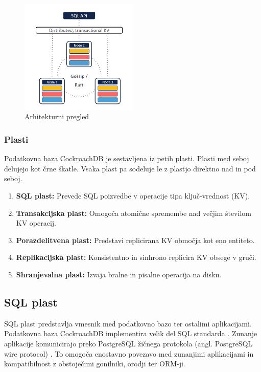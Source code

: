 \documentclass[a4paper, 12pt]{book}
\begin{document}
\begin{figure}[H]
\begin{center}
\includegraphics[width=0.5\textwidth]{resources/crdb-arhitecture-overview.png}
\end{center}
\caption{Arhitekturni pregled \cite{CRDB-2017}}
\label{img_crdb_arhitecture_overview}
\end{figure}

\subsubsection{Plasti}
Podatkovna baza CockroachDB je sestavljena iz petih plasti. Plasti med seboj delujejo kot črne škatle. Vsaka plast pa sodeluje le z plastjo direktno nad in pod seboj.

\begin{enumerate}
    \item \textbf{SQL plast:} Prevede SQL poizvedbe v operacije tipa ključ-vrednost (KV).
    \item \textbf{Transakcijska plast:} Omogoča atomične spremembe nad večjim šte\-vi\-lom KV operacij.
    \item \textbf{Porazdelitvena plast:} Predstavi replicirana KV območja kot eno entiteto.
    \item \textbf{Replikacijska plast:} Konsistentno in sinhrono replicira KV obsege v gruči.
    \item \textbf{Shranjevalna plast:} Izvaja bralne in pisalne operacija na disku.
\end{enumerate}

\subsection{SQL plast}

SQL plast predstavlja vmesnik med podatkovno bazo ter ostalimi aplikacijami.  Podatkovna baza CockroachDB implementira velik del SQL standarda \cite{CRDB-sql-standard}. Zunanje aplikacije komunicirajo preko PostgreSQL žičnega protokola (angl. PostgreSQL wire protocol) \cite{psql-wire-protocol}. To omogoča enostavno povezavo med zunanjimi aplikacijami in kompatibilnost z obstoječimi gonilniki, orodji ter ORM-ji.
\end{document}

